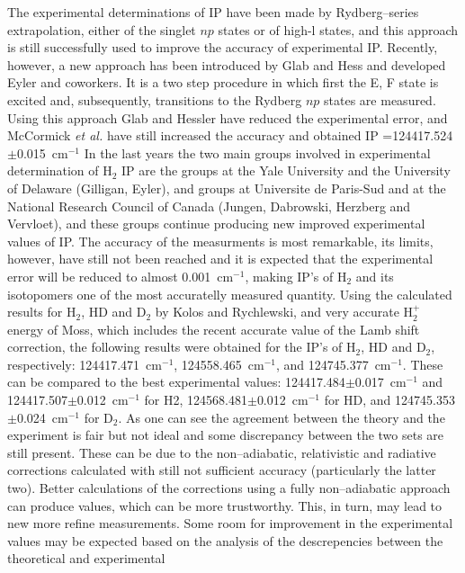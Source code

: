 {{The experimental determinations of IP have been made
by Rydberg--series extrapolation, either of the singlet
$np$ states or of high-l states, and this approach is still
successfully used to improve the accuracy of experimental IP.
Recently, however, a new approach has been introduced by Glab and
Hess\cite{k52} and developed  Eyler and coworkers.\cite{k53}
It is a two step procedure in which first the E, F state
is excited and, subsequently, transitions to the
Rydberg $np$ states are measured.  Using this approach Glab
and Hessler\cite{k52} have reduced the experimental error, and
McCormick {\it et al.}\cite{k53} have still increased the accuracy
and obtained IP =124417.524$\pm$0.015~cm$^{-1}$
In the last years the two main groups involved in experimental
determination of H$_2$ IP are the groups at the Yale University
and the University of Delaware (Gilligan, Eyler), and groups
at Universite de Paris-Sud and at the National Research Council
of Canada (Jungen, Dabrowski, Herzberg and Vervloet),\cite{k57}
and these groups continue producing new improved experimental
values of IP. The accuracy of the measurments is most remarkable, its
limits, however, have still not been reached and it is
expected\cite{k42p} that the experimental error will be reduced
to almost 0.001~cm$^{-1}$, making IP's of H$_2$ and its
isotopomers one of the most accuratelly measured quantity.
Using the  calculated
results for H$_2$, HD and D$_2$ by Kolos and Rychlewski,\cite{k12}
and very accurate H$_2^+$ energy of Moss,\cite{k58}
which includes the recent accurate value of the Lamb shift
correction,\cite{k59} the following results were obtained
for the IP's of H$_2$, HD and D$_2$, respectively:
124417.471~cm$^{-1}$, 124558.465~cm$^{-1}$, and 124745.377~cm$^{-1}$.
\cite{kk}
These can be compared to the best experimental values:
124417.484$\pm$0.017~cm$^{-1}$ and 124417.507$\pm$0.012~cm$^{-1}$
for H2,\cite{k42,k57} 124568.481$\pm$0.012~cm$^{-1}$ for HD,\cite{k42}
and 124745.353$\pm$0.024~cm$^{-1}$ for D$_2$.
As one can see the agreement between the theory and the
experiment is fair but not ideal and some discrepancy between
the two sets are still present. These can be due to the
non--adiabatic, relativistic and radiative corrections
calculated with still not sufficient accuracy (particularly the
latter two). Better calculations of the corrections using
a fully non--adiabatic approach can produce values, which can
be more trustworthy. This, in turn, may lead to new more refine
measurements.
Some room for improvement in the experimental
values may be expected based on the analysis
of the descrepencies between the theoretical and experimental
}}
